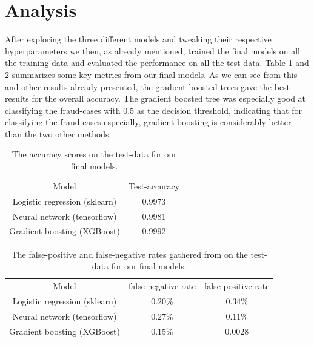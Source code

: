 \documentclass{article}
\begin{document}
\section{Analysis}
After exploring the three different models and tweaking their respective
hyperparameters we then, as already mentioned, trained the final models on all
the training-data and evaluated the performance on all the test-data. Table
\ref{finalmodelscomparison} and \ref{finalmodelscomparisonfnrtpr} summarizes
some key metrics from our final models. As we can see from this and other
results already presented, the gradient boosted trees gave the best results for
the overall accuracy.  The gradient boosted tree was especially good at
classifying the fraud-cases with $0.5$ as the decision threshold, indicating
that for classifying the fraud-cases especially, gradient boosting is
considerably better than the two other methods.
\begin{table}
	\centering
	\begin{tabular}{| c | c |}
		Model                         & Test-accuracy \\
		Logistic regression (sklearn) & 0.9973        \\
		Neural network (tensorflow)   & 0.9981        \\
		Gradient boosting (XGBoost)   & 0.9992
	\end{tabular}
	\caption{The accuracy scores on the test-data for our final models.}
	\label{finalmodelscomparison}
\end{table}
\begin{table}
	\centering
	\begin{tabular}{| c | c | c |}
		Model                         & false-negative rate & false-positive rate \\
		Logistic regression (sklearn) & $0.20\%$            & $0.34\%$            \\
		Neural network (tensorflow)   & $0.27\%$            & $0.11\%$            \\
		Gradient boosting (XGBoost)   & $0.15\%$            & $0.0028$
	\end{tabular}
	\caption{The false-positive and false-negative rates gathered from on the test-data for our final models.}
	\label{finalmodelscomparisonfnrtpr}
\end{table}
\end{document}

